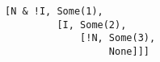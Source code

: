 \begin{lstlisting}[style=scalaioScala]
[N & !I, Some(1),
         [I, Some(2),
             [!N, Some(3),
                  None]]]
\end{lstlisting}
